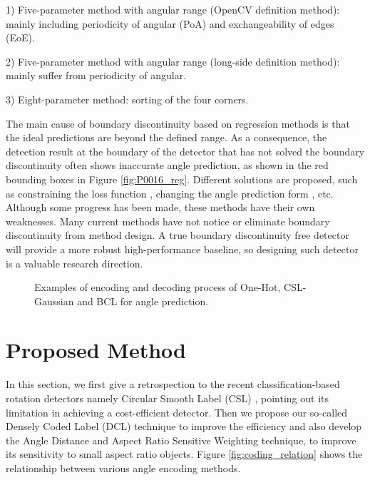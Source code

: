 \documentclass[final]{cvpr}
\begin{document}
1) Five-parameter method with  angular range (OpenCV definition method): mainly including periodicity of angular (PoA) and exchangeability of edges (EoE).

2) Five-parameter method with  angular range (long-side definition method): mainly suffer from periodicity of angular.

3) Eight-parameter method: sorting of the four corners.

The main cause of boundary discontinuity based on regression methods is that the ideal predictions are beyond the defined range. As a consequence, the detection result at the boundary of the detector that has not solved the boundary discontinuity often shows inaccurate angle prediction, as shown in the red bounding boxes in Figure \ref{fig:P0016_reg}. Different solutions are proposed, such as constraining the loss function \cite{qian2019learning, yang2019scrdet}, changing the angle prediction form \cite{yang2020arbitrary,yang2020on}, etc. Although some progress has been made, these methods have their own weaknesses. Many current methods have not notice or eliminate boundary discontinuity from method design. A true boundary discontinuity free detector will provide a more robust high-performance baseline, so designing such detector is a valuable research direction. 


\begin{figure}[!tb]
	\centering
		\begin{multicols}{2}
		
		
        \end{multicols}
	\centering
	\caption{Examples  of  encoding  and  decoding  process  of  One-Hot, CSL-Gaussian and BCL for angle prediction.}
	\label{fig:angle_label}
	\vspace{-10pt}
\end{figure}

\section{Proposed Method}
In this section, we first give a retrospection to the recent classification-based rotation detectors namely  Circular Smooth Label (CSL) \cite{yang2020arbitrary}, pointing out its limitation in achieving a cost-efficient detector. Then we propose our so-called Densely Coded Label (DCL) technique to improve the efficiency and also develop the Angle Distance and Aspect Ratio Sensitive Weighting technique, to improve its sensitivity to small aspect ratio objects. Figure \ref{fig:coding_relation} shows the relationship between various angle encoding methods.
\end{document}
